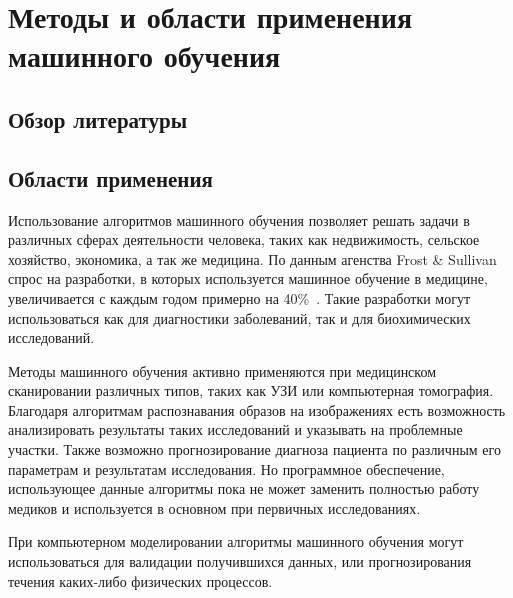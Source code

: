 \newpage
\section{\Large Методы и области применения машинного обучения}\vspace{-7mm}

\subsection{Обзор литературы}
\subsection{Области применения}
Использование алгоритмов машинного обучения позволяет решать задачи в различных сферах деятельности человека, таких как недвижимость, сельское хозяйство, экономика, а так же медицина. По данным агенства Frost \& Sullivan спрос на разработки, в которых используется машинное обучение в медицине, увеличивается с каждым годом примерно на 40\%~\cite{habrbigdatamedicine}. Такие разработки могут использоваться как для диагностики заболеваний, так  и для биохимических исследований.
\par
Методы машинного обучения активно применяются при медицинском сканировании различных типов, таких как УЗИ или компьютерная томография. Благодаря алгоритмам распознавания образов на изображениях есть возможность анализировать результаты таких исследований и указывать на проблемные участки. Также возможно прогнозирование диагноза пациента по различным его параметрам и результатам исследования. Но программное обеспечение, использующее данные алгоритмы пока не может заменить полностью работу медиков и используется в основном при первичных исследованиях.
\par
При компьютерном моделировании алгоритмы машинного обучения могут использоваться для валидации получившихся данных, или прогнозирования течения каких-либо физических процессов.

